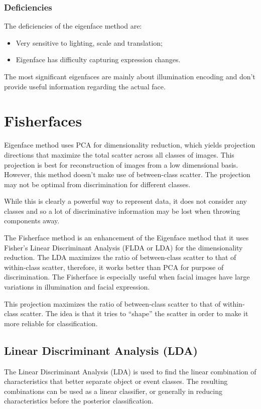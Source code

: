 \subsubsection{Deficiencies}
The deficiencies of the eigenface method are:
\begin{itemize}
\item Very sensitive to lighting, scale and translation;
\item Eigenface has difficulty capturing expression changes. 
\end{itemize}

The most significant eigenfaces are mainly about illumination encoding and don't provide useful information regarding the actual face.


\section{Fisherfaces}
Eigenface method uses PCA for dimensionality reduction, which yields projection directions that maximize the total scatter across all classes of images. This projection is best for reconstruction of images from a low dimensional basis. However, this method doesn’t make use of between-class scatter. The projection may not be optimal from discrimination for different classes.

While this is clearly a powerful way to represent data, it does not consider any classes and so a lot of discriminative information may be lost when throwing components away.

The Fisherface method is an enhancement of the Eigenface method that it uses Fisher’s Linear Discriminant Analysis (FLDA or LDA) for the dimensionality reduction. The LDA maximizes the ratio of between-class scatter to that of within-class scatter, therefore, it works better than PCA for purpose of discrimination. The Fisherface is especially useful when facial images have large variations in illumination and facial expression.

This projection maximizes the ratio of between-class scatter to that of within-class scatter. The idea is that it tries to “shape” the scatter in order to make it more reliable for classification.

\subsection{Linear Discriminant Analysis (LDA)}
The Linear Discriminant Analysis (LDA) is used to find the linear combination of characteristics that better separate  object or event classes. The resulting combinations can be used as a linear classifier, or generally in reducing characteristics before the posterior classification.

